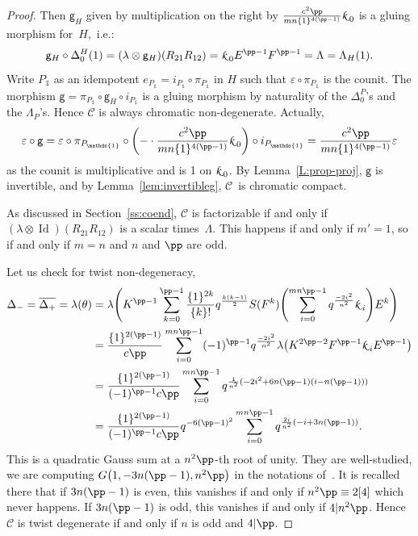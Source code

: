 \documentclass[10pt,a4paper]{amsart}
\numberwithin{equation}{section}
\newcommand{\smk}{{\fontfamily{pzc}\selectfont \text{k}}}
\newcommand{\gm}{{\mathsf{g}}}
\numberwithin{theorem}{section}
\numberwithin{proposition}{section}
\numberwithin{definition}{section}
\numberwithin{lemma}{section}
\numberwithin{corollary}{section}
\numberwithin{remark}{section}
\numberwithin{example}{section}
\newcommand{\cat}{\mathcal{C}}
\newcommand{\unit}{\ensuremath{\mathds{1}}}
\newcommand{\Id}{\operatorname{Id}}
\begin{document}
\begin{proof}
 Then $\gm_H$ given by multiplication on the right by $\frac{c^2{\pp}}{mn\{1\}^{4({\pp}-1)}}\smk_{\;0}$ is a gluing morphism for~$H$,~i.e.:
\[
\gm_H \circ \Delta_0^H(1) = (\lambda \otimes \gm_H)(R_{21}R_{12})= \smk_{\;0}E^{{\pp}-1}F^{{\pp}-1}=\Lambda=\Lambda_H(1).
\]
Write $P_\unit$ as an idempotent
$e_{P_\unit}=i_{P_\unit} \circ \pi_{P_\unit}$ in $H$ such that
$\varepsilon \circ \pi_{P_\unit}$ is the counit. The morphism
$\gm = \pi_{P_\unit} \circ \gm_H \circ i_{P_\unit}$ is a gluing
morphism by naturality of the $\Delta_0^P$'s and the $\Lambda_P$'s.
Hence $\cat$ is always chromatic non-degenerate. Actually,
\[
\varepsilon\circ\gm=\varepsilon\circ\pi_{P_\unit}\circ\left(-\cdot \frac{c^2{\pp}}{mn\{1\}^{4({\pp}-1)}}\smk_{\;0}\right)\circ i_{P_\unit}=\frac{c^2{\pp}}{mn\{1\}^{4({\pp}-1)}}\varepsilon
\]
as the counit is multiplicative and is 1 on $\smk_{\;0}$.
By Lemma~\ref{L:prop-proj}, $\gm$ is invertible,
and by Lemma~\ref{lem:invertibleg}, $\cat$~is chromatic compact.

As discussed in Section~\ref{ss:coend}, $\cat$ is factorizable if and only if $(\lambda \otimes \Id)(R_{21}R_{12})$ is a scalar times~$\Lambda$. This happens if and only if $m'=1$, so if and only if $m=n$ and $n$ and ${\pp}$ are odd.

Let us check for twist non-degeneracy,
\begin{align*}
\Delta_-=\overline{\Delta_+}=\lambda(\theta) &{}= \lambda\Biggl(K^{{\pp}-1}\sum_{k=0}^{{\pp}-1} \frac{\{1\}^{2k}}{\{k\}!}q^\frac{k(k-1)}{2} S(F^k)\Biggl(\sum_{i=0}^{mn{\pp}-1} q^{\frac{-2i^2}{n^2}}\smk_{\; i}\Biggr) E^k\Biggr)\\
&{}= \frac{\{1\}^{2({\pp}-1)}}{c{\pp}}\sum\limits_{i=0}^{mn{\pp}-1}(-1)^{{\pp}-1}q^{\frac{-2i^2}{n^2}} \lambda\bigl(K^{2{\pp}-2}F^{{\pp}-1}\smk_{\; i}E^{{\pp}-1}\bigr)\\
&{}= \frac{\{1\}^{2({\pp}-1)}}{(-1)^{{\pp}-1}c{\pp}}\sum\limits_{i=0}^{mn{\pp}-1}q^{\frac{1}{n^2} (-2i^2+6n({\pp}-1)(i-n({\pp}-1)) )}\\
&{}= \frac{\{1\}^{2({\pp}-1)}}{(-1)^{{\pp}-1}c{\pp}}q^{-6({\pp}-1)^2}\sum\limits_{i=0}^{mn{\pp}-1}q^{\frac{2i}{n^2} (-i+3n({\pp}-1) )}.
\end{align*}
This is a quadratic Gauss sum at a $n^2{\pp}$-th root of unity. They are well-studied, we are computing $G\bigl(1,-3n(\pp-1),n^2\pp\bigr)$ in the notations of~\cite[Appendix B]{BD21}. It is recalled there that if $3n({\pp}-1)$ is even, this vanishes if and only if $n^2{\pp} \equiv 2[4]$ which never happens. If $3n({\pp}-1)$ is odd, this vanishes if and only if $4\vert n^2{\pp}$. Hence $\cat$ is twist degenerate if and only if $n$ is odd and $4\vert {\pp}$.
\end{proof}
\end{document}
